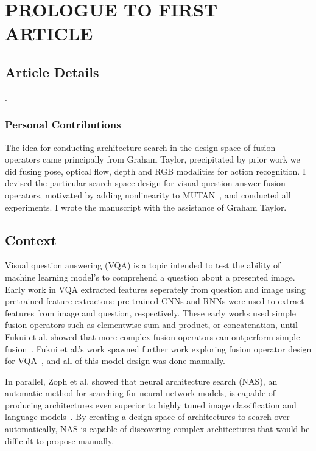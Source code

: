 \chapter{PROLOGUE TO FIRST ARTICLE}


\section{Article Details}

.

\subsection{Personal Contributions}

The idea for conducting architecture search in the design space of fusion
operators came principally from Graham Taylor, precipitated by prior work we
did fusing pose, optical flow, depth and RGB modalities for action recognition.
I devised the particular search space design for visual question answer fusion
operators, motivated by adding nonlinearity to MUTAN~\cite{ben2017mutan}, and
conducted all experiments.
I wrote the manuscript with the assistance of Graham Taylor.


\section{Context}

Visual question answering (VQA) is a topic intended to test the ability of
machine learning model's to comprehend a question about a presented image.
Early work in VQA extracted features seperately from question and image using
pretrained feature extractors: pre-trained CNNs and RNNs were used to extract
features from image and question, respectively.
These early works used simple fusion operators such as elementwise sum and
product, or concatenation, until Fukui et al. showed that more complex fusion
operators can outperform simple fusion~\cite{fukui2016multimodalCB}.
Fukui et al.'s work spawned further work exploring fusion operator design for
VQA~\cite{Kim2017, ben2017mutan}, and all of this model design was done
manually.

In parallel, Zoph et al. showed that neural architecture
search (NAS), an automatic method for searching for neural network models, is
capable of producing architectures even superior to highly tuned image
classification and language models~\cite{zoph2016neural}.
By creating a design space of architectures to search over automatically, NAS
is capable of discovering complex architectures that would be difficult to
propose manually.

